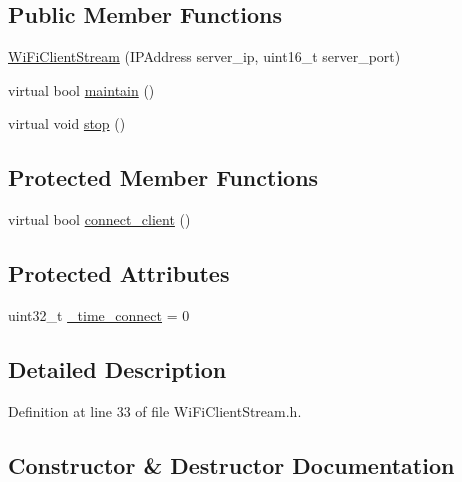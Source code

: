 \subsection*{Public Member Functions}
\begin{DoxyCompactItemize}
\item 
\hyperlink{class_wi_fi_client_stream_a73570f630cb7f9fe40466f24266c5828}{Wi\+Fi\+Client\+Stream} (I\+P\+Address server\+\_\+ip, uint16\+\_\+t server\+\_\+port)
\item 
virtual bool \hyperlink{class_wi_fi_client_stream_a7fd2465acdbb07285fdac25c490c04d6}{maintain} ()
\item 
virtual void \hyperlink{class_wi_fi_client_stream_ac81b72c8c61f10a5f950d9deabc7ffeb}{stop} ()
\end{DoxyCompactItemize}
\subsection*{Protected Member Functions}
\begin{DoxyCompactItemize}
\item 
virtual bool \hyperlink{class_wi_fi_client_stream_afb68ea613d492a7b3aebca60ed5a0da6}{connect\+\_\+client} ()
\end{DoxyCompactItemize}
\subsection*{Protected Attributes}
\begin{DoxyCompactItemize}
\item 
uint32\+\_\+t \hyperlink{class_wi_fi_client_stream_a9d0a90467736b552cd89b5eec494ef50}{\+\_\+time\+\_\+connect} = 0
\end{DoxyCompactItemize}


\subsection{Detailed Description}


Definition at line 33 of file Wi\+Fi\+Client\+Stream.\+h.



\subsection{Constructor \& Destructor Documentation}
